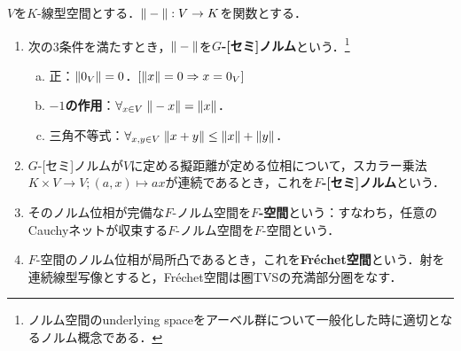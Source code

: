 \documentclass[uplatex,dvipdfmx]{jsreport}
\begin{document}
\begin{definition}
    $V$を$K$-線型空間とする．$\|-\|:V\to K$を関数とする．
    \begin{enumerate}
        \item 次の3条件を満たすとき，$\|-\|$を\textbf{$G$-[セミ]ノルム}という．\footnote{ノルム空間のunderlying spaceをアーベル群について一般化した時に適切となるノルム概念である．}
        \begin{enumerate}[(a)]
            \item 正：$\|0_V\|=0$．$[\|x\|=0\Rightarrow x=0_V]$
            \item \textbf{$-1$の作用}：$\forall_{x\in V}\;\|-x\|=\|x\|$．
            \item 三角不等式：$\forall_{x,y\in V}\;\|x+y\|\le\|x\|+\|y\|$．
        \end{enumerate}
        \item $G$-[セミ]ノルムが$V$に定める擬距離が定める位相について，スカラー乗法$K\times V\to V;(a,x)\mapsto ax$が連続であるとき，これを\textbf{$F$-[セミ]ノルム}という．
        \item そのノルム位相が完備な$F$-ノルム空間を\textbf{$F$-空間}という：すなわち，任意のCauchyネットが収束する$F$-ノルム空間を$F$-空間という．
        \item $F$-空間のノルム位相が局所凸であるとき，これを\textbf{Fréchet空間}という．射を連続線型写像とすると，Fréchet空間は圏TVSの充満部分圏をなす．
    \end{enumerate}
\end{definition}
\end{document}
